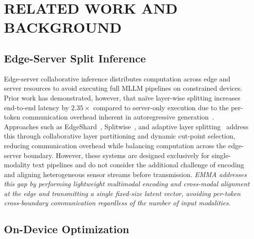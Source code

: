 \section{RELATED WORK AND BACKGROUND}

\subsection{Edge-Server Split Inference}

Edge-server collaborative inference distributes computation across edge and server
resources to avoid executing full MLLM pipelines on constrained devices. Prior work has
demonstrated, however, that na\"{i}ve layer-wise splitting increases end-to-end latency
by $2.35\times$ compared to server-only execution due to the per-token communication
overhead inherent in autoregressive generation~\cite{park2025specedge}. Approaches such
as EdgeShard~\cite{zhang2025edgeshard}, Splitwise~\cite{younesi2025splitwise}, and
adaptive layer splitting~\cite{chen2025adaptivesplit} address this through collaborative
layer partitioning and dynamic cut-point selection, reducing communication overhead while
balancing computation across the edge-server boundary. However, these systems are designed
exclusively for single-modality text pipelines and do not consider the additional challenge
of encoding and aligning heterogeneous sensor streams before transmission.
{\em EMMA addresses this gap by performing lightweight multimodal encoding and cross-modal
alignment at the edge and transmitting a single fixed-size latent vector, avoiding
per-token cross-boundary communication regardless of the number of input modalities.}

\subsection{On-Device Optimization}

